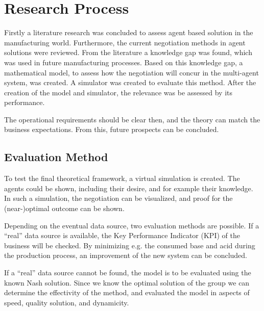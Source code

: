 \section{Research Process}
Firstly a literature research was concluded to assess agent based solution in the manufacturing world. Furthermore, the current negotiation methods in agent solutions were reviewed. From the literature a knowledge gap was found, which was used in future manufacturing processes. Based on this knowledge gap, a mathematical model, to assess how the negotiation will concur in the multi-agent system, was created. A simulator was created to evaluate this method. After the creation of the model and simulator, the relevance was be assessed by its performance.


The operational requirements should be clear then, and the theory can match the business expectations. From this, future prospects can be concluded.


\subsection{Evaluation Method}
To test the final theoretical framework, a virtual simulation is created. The agents could be shown, including their desire, and for example their knowledge. In such a simulation, the negotiation can be visualized, and proof for the (near-)optimal outcome can be shown. 

Depending on the eventual data source, two evaluation methods are possible. If a ``real'' data source is available, the Key Performance Indicator (KPI) of the business will be checked. By minimizing e.g. the consumed base and acid during the production process, an improvement of the new system can be concluded.

If a ``real'' data source cannot be found, the model is to be evaluated using the known Nash solution. Since we know the optimal solution of the group we can determine the effectivity of the method, and evaluated the model in aspects of speed, quality solution, and dynamicity.

